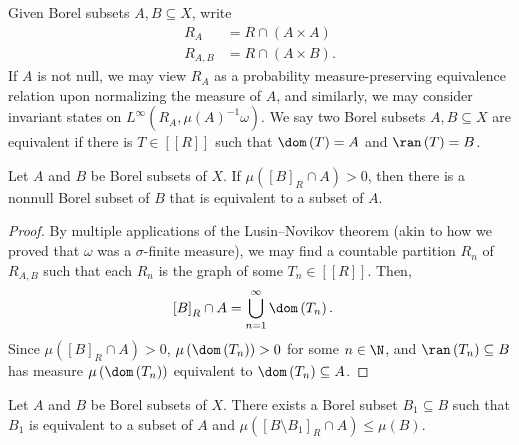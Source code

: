 \documentclass[10pt]{mypackage}
\begin{document}
Given Borel subsets $A,B\subseteq X$, write
\begin{align*}
  R_A &= R\cap \left( A\times A \right)\\
  R_{A,B} &= R\cap \left( A\times B \right).
\end{align*}
If $A$ is not null, we may view $R_A$ as a probability measure-preserving equivalence relation upon normalizing the measure of $A$, and similarly, we may consider invariant states on $L^{\infty}\left( R_A,\mu(A)^{-1}\omega \right)$. We say two Borel subsets $A,B\subseteq X$ are equivalent if there is $T\in \left[ \left[ R \right] \right]$ such that $\dom\left( T \right) = A$ and $\ran\left( T \right) = B$.
\begin{lemma}
  Let $A$ and $B$ be Borel subsets of $X$. If $\mu\left( \left[ B \right]_R\cap A \right) > 0$, then there is a nonnull Borel subset of $B$ that is equivalent to a subset of $A$.
\end{lemma}
\begin{proof}
  By multiple applications of the Lusin--Novikov theorem (akin to how we proved that $\omega$ was a $\sigma$-finite measure), we may find a countable partition $R_n$ of $R_{A,B}$ such that each $R_n$ is the graph of some $T_n\in \left[ \left[ R \right] \right]$. Then,
  \begin{align*}
    \left[ B \right]_R \cap A &= \bigcup_{n=1}^{\infty}\dom\left( T_n \right).
  \end{align*}
  Since $\mu\left( \left[ B \right]_R\cap A \right) > 0$, $\mu\left( \dom\left( T_n \right) \right) > 0$ for some $n\in \N$, and $\ran\left( T_n \right)\subseteq B$ has measure $\mu\left( \dom\left( T_n \right) \right)$ equivalent to $\dom\left( T_n \right)\subseteq A$.
\end{proof}
\begin{lemma}
  Let $A$ and $B$ be Borel subsets of $X$. There exists a Borel subset $B_1\subseteq B$ such that $B_1$ is equivalent to a subset of $A$ and $\mu\left( \left[ B\setminus B_1 \right]_R\cap A \right)\leq \mu\left( B \right)$.
\end{lemma}
\end{document}
